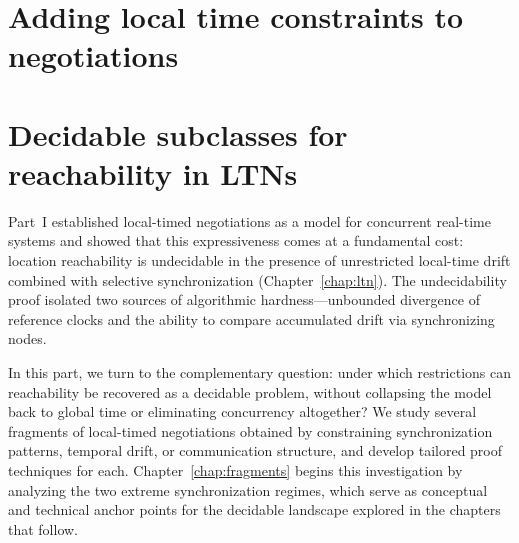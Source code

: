 \documentclass[oneside,12pt]{thesis}
\begin{document}
\maketitle
{}
\makedeclarationpage
\makecertificatepage
\makeacknowledgementpage
\tableofcontents
\clearpage
{}
\pagestyle{fancy}



\part{Adding local time constraints to negotiations}




\part{Decidable subclasses for reachability in LTNs}

Part~I established local-timed negotiations as a model for concurrent real-time systems and showed that this expressiveness comes at a fundamental cost: location reachability is undecidable in the presence of unrestricted local-time drift combined with selective synchronization (Chapter~\ref{chap:ltn}). The undecidability proof isolated two sources of algorithmic hardness—unbounded divergence of reference clocks and the ability to compare accumulated drift via synchronizing nodes.

In this part, we turn to the complementary question: under which restrictions can reachability be recovered as a decidable problem, without collapsing the model back to global time or eliminating concurrency altogether? We study several fragments of local-timed negotiations obtained by constraining synchronization patterns, temporal drift, or communication structure, and develop tailored proof techniques for each. Chapter~\ref{chap:fragments} begins this investigation by analyzing the two extreme synchronization regimes, which serve as conceptual and technical anchor points for the decidable landscape explored in the chapters that follow.






\appendix



\end{document}
